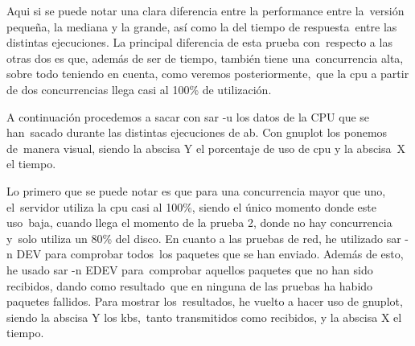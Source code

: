 \documentclass[11pt,twoside,a4paper]{book}
\begin{document}
Aqui si se puede notar una clara diferencia entre la performance entre la\
versión pequeña, la mediana y la grande, así como la del tiempo de respuesta\
entre las distintas ejecuciones. La principal diferencia de esta prueba con\
respecto a las otras dos es que, además de ser de tiempo, también tiene una\
concurrencia alta, sobre todo teniendo en cuenta, como veremos posteriormente,\
que la cpu a partir de dos concurrencias llega casi al 100\% de utilización.

A continuación procedemos a sacar con sar -u los datos de la CPU que se han\
sacado durante las distintas ejecuciones de ab. Con gnuplot los ponemos de\
manera visual, siendo la abscisa Y el porcentaje de uso de cpu y la abscisa\
X el tiempo.


%
Lo primero que se puede notar es que para una concurrencia mayor que uno, el\
servidor utiliza la cpu casi al 100\%, siendo el único momento donde este uso\
baja, cuando llega el momento de la prueba 2, donde no hay concurrencia y\
solo utiliza un 80\% del disco. \newline
En cuanto a las pruebas de red, he utilizado sar -n DEV para comprobar todos\
los paquetes que se han enviado. Además de esto, he usado sar -n EDEV para\
comprobar aquellos paquetes que no han sido recibidos, dando como resultado\
que en ninguna de las pruebas ha habido paquetes fallidos. Para mostrar los\
resultados, he vuelto a hacer uso de gnuplot, siendo la abscisa Y los kbs,\
tanto transmitidos como recibidos, y la abscisa X el tiempo.
\end{document}
